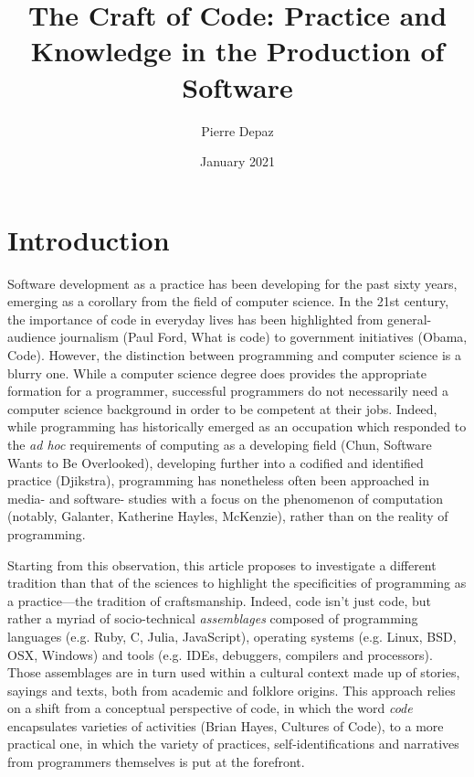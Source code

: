 \documentclass{article}
\begin{document}
\title{The Craft of Code: Practice and Knowledge in the Production of Software}
\author{Pierre Depaz}
\date{January 2021}
\maketitle

\section{Introduction}

Software development as a practice has been developing for the past sixty years, emerging as a corollary from the field of computer science. In the 21st century, the importance of code in everyday lives has been highlighted from general-audience journalism (Paul Ford, What is code) to government initiatives (Obama, Code). However, the distinction between programming and computer science is a blurry one. While a computer science degree does provides the appropriate formation for a programmer, successful programmers do not necessarily need a computer science background in order to be competent at their jobs. Indeed, while programming has historically emerged as an occupation which responded to the \textit{ad hoc} requirements of computing as a developing field (Chun, Software Wants to Be Overlooked), developing further into a codified and identified practice (Djikstra), programming has nonetheless often been approached in media- and software- studies with a focus on the phenomenon of computation (notably, Galanter, Katherine Hayles, McKenzie), rather than on the reality of programming.

Starting from this observation, this article proposes to investigate a different tradition than that of the sciences to highlight the specificities of programming as a practice—the tradition of craftsmanship. Indeed, code isn't just code, but rather a myriad of socio-technical \textit{assemblages} composed of programming languages (e.g. Ruby, C, Julia, JavaScript), operating systems (e.g. Linux, BSD, OSX, Windows) and tools (e.g. IDEs, debuggers, compilers and processors). Those assemblages are in turn used within a cultural context made up of stories, sayings and texts, both from academic and folklore origins. This approach relies on a shift from a conceptual perspective of code, in which the word \textit{code} encapsulates varieties of activities (Brian Hayes, Cultures of Code), to a more practical one, in which the variety of practices, self-identifications and narratives from programmers themselves is put at the forefront.
\end{document}
